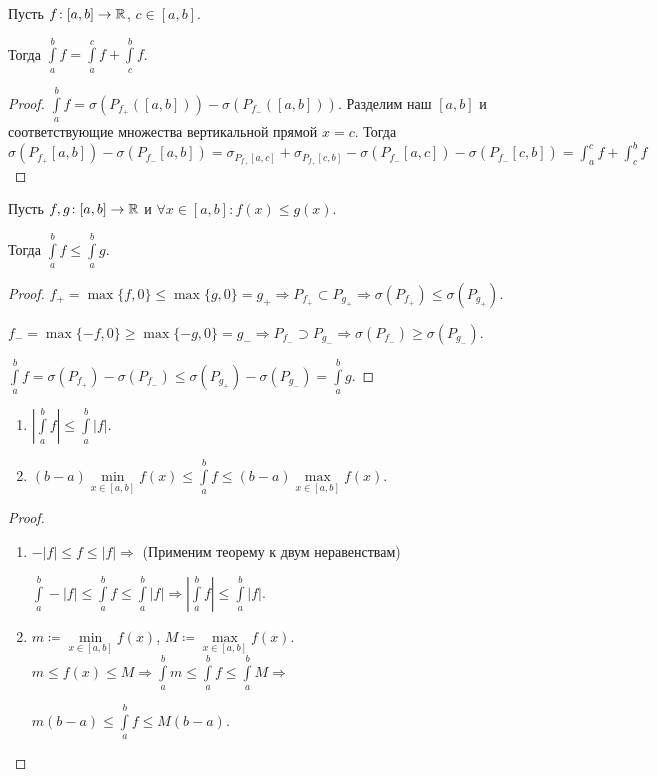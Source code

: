 \begin{theorem}
    Пусть $f\!: [a, b] \to \mathbb{R}$,  $c \in [a, b]$.

    Тогда  $\int\limits_a^b f = \int\limits_a^c f + \int\limits_c^b f$.
\end{theorem}
\begin{proof}
	$\int\limits_a^b f = \sigma(P_{f_+}([a, b])) - \sigma(P_{f_-}([a, b]))$. Разделим наш $[a, b]$ и соответствующие множества вертикальной прямой $x=c$. Тогда $\sigma(P_{f_+}[a, b]) - \sigma(P_{f_-}[a, b]) = \sigma_{P_{f_+}[a, c]} + \sigma_{P_{f_+}[c, b]} - \sigma(P_{f_-}[a, c]) - \sigma(P_{f_-}[c, b]) = \int_a^c f + \int_c^b f$
\end{proof}
\begin{theorem}
    Пусть $f, g\!: [a, b] \to \mathbb{R}$ и  $\forall x \in [a, b]\!: f(x) \le g(x)$.

    Тогда $\int\limits_a^b f \le \int\limits_a^b g$. 
\end{theorem}
\begin{proof}
    $f_+ = \max\{f, 0\} \le \max\{g, 0\} = g_+ \Rightarrow P_{f_+} \subset P_{g_+} \Rightarrow \sigma(P_{f_+}) \le \sigma(P_{g_+})$.

    $f_- = \max\{-f, 0\} \ge \max\{-g, 0\} = g_- \Rightarrow P_{f_-} \supset P_{g_-} \Rightarrow \sigma(P_{f_-}) \ge \sigma(P_{g_-})$.
    
    $\int\limits_a^b f = \sigma(P_{f_+}) - \sigma(P_{f_-}) \le \sigma(P_{g_+}) - \sigma(P_{g_-}) = \int\limits_a^b g$.
\end{proof}
\begin{consequence}
    \begin{enumerate}
        \item $|\int\limits_a^b f| \le \int\limits_a^b |f|$.
        \item $(b-a)\min\limits_{x \in [a, b]} f(x) \le \int\limits_a^b f \le (b-a)\max\limits_{x \in [a, b]} f(x)$.
    \end{enumerate}
\end{consequence}
\begin{proof}
    \begin{enumerate}
        \item $-|f| \le f \le |f| \Rightarrow$ (Применим теорему к двум неравенствам)
        
        $\int\limits_a^b -|f| \le \int\limits_a^b f \le \int\limits_a^b |f| \Rightarrow |\int\limits_a^b f| \le \int\limits_a^b |f|$.
	\item $m \coloneqq \min\limits_{x \in [a, b]} f(x)$,  $M \coloneqq \max\limits_{x \in [a, b]} f(x)$.  $m \le f(x) \le M \Rightarrow \int\limits_a^b m \le \int\limits_a^b f \le \int\limits_a^b M \Rightarrow$
	
	$m(b - a) \le \int\limits_a^b f \le M(b - a)$.
    \end{enumerate}
\end{proof}
